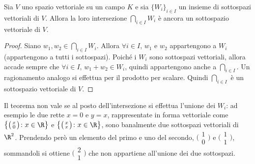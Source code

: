 \begin{teorema} \label{t:intersezione-sottospazi}
	Sia $V$ uno spazio vettoriale su un campo $K$ e sia $\{W_i\}_{i\in I}$ un insieme di sottospazi vettoriali di $V$.
	Allora la loro intersezione	$\bigcap_{i\in I}W_i$ è ancora un sottospazio vettoriale di $V$.
\end{teorema}
\begin{proof}
	Siano $w_1,w_2\in\bigcap_{i\in I}W_i$.
	Allora $\forall i\in I$, $w_1$ e $w_2$ appartengono a $W_i$ (appartengono a tutti i sottospazi).
	Poiché i $W_i$ sono sottospazi vettoriali, allora accade sempre che $\forall i\in I$, $w_1+w_2\in W_i$, quindi appartengono anche a $\bigcap_{i\in I}$.
	Un ragionamento analogo si effettua per il prodotto per scalare.
	Quindi $\bigcap_{i\in I}$ è un sottospazio vettoriale di $V$.
\end{proof}
Il teorema non vale se al posto dell'intersezione si effettua l'unione dei $W_i$: ad esempio le due rette $x=0$ e $y=x$, rappresentate in forma vettoriale come $\big\{\big(\begin{smallmatrix} x\\0 \end{smallmatrix}\big)\colon x\in\R\big\}$ e $\big\{\big(\begin{smallmatrix} x\\x \end{smallmatrix}\big)\colon x\in\R\big\}$, sono banalmente due sottospazi vettoriali di $\R^2$.
Prendendo però un elemento del primo e uno del secondo, $\big(\begin{smallmatrix} 1\\0 \end{smallmatrix}\big)$ e $\big(\begin{smallmatrix} 1\\1 \end{smallmatrix}\big)$, sommandoli si ottiene $\big(\begin{smallmatrix} 2\\1 \end{smallmatrix}\big)$ che non appartiene all'unione dei due sottospazi.

